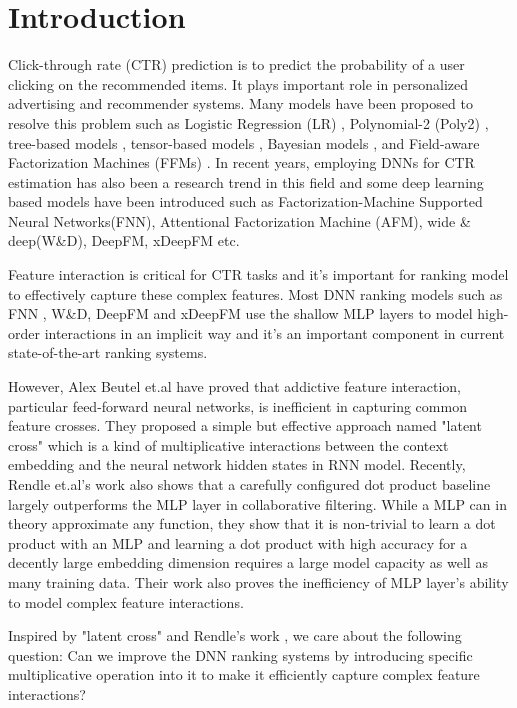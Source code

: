 \documentclass[sigconf]{acmart}
\begin{document}
\section{Introduction}
Click-through rate (CTR) prediction is to predict the probability of a user clicking on the recommended items. It plays important role in personalized advertising and recommender systems. Many models have been proposed to resolve this problem such as Logistic Regression (LR) \cite{10.1145/2487575.2488200}, Polynomial-2 (Poly2) \cite{rendle2010factorization}, tree-based models \cite{he2014practical}, tensor-based models \cite{koren2009matrix}, Bayesian models \cite{graepel2010web}, and Field-aware Factorization Machines (FFMs) \cite{juan2016field}. In recent years, employing DNNs for CTR estimation has also been a research trend in this field and some deep learning based models have been introduced such as Factorization-Machine Supported Neural Networks(FNN)\cite{zhang2016deep}, Attentional  Factorization Machine (AFM)\cite{cheng2016wide}, wide \& deep(W\&D)\cite{xiao2017attentional}, DeepFM\cite{guo2017deepfm}, xDeepFM\cite{lian2018xdeepfm} etc.


Feature interaction is critical for CTR tasks and it's important for ranking model to effectively capture these complex features. Most DNN ranking models such as FNN , W\&D, DeepFM and xDeepFM use the shallow MLP layers to model high-order interactions in an implicit way and it's an important component in current state-of-the-art ranking systems.


However, Alex Beutel et.al \cite{beutel2018latent} have proved that addictive feature interaction, particular feed-forward neural networks, is inefficient in capturing common feature crosses. They proposed a simple but effective approach named "latent cross" which is a kind of multiplicative interactions between the context embedding and the neural network hidden states in RNN model. Recently, Rendle et.al's work \cite{rendle2020neural} also shows that a carefully configured dot product baseline largely outperforms the MLP layer in collaborative filtering. While a MLP can in theory approximate any function, they show that it is non-trivial to learn a dot product with an MLP and  learning a dot product with high accuracy for a decently large embedding dimension requires a large model capacity as well as many training data. Their work also proves the inefficiency of MLP layer's ability to model complex feature interactions.



Inspired by "latent cross"\cite{beutel2018latent} and Rendle's work \cite{rendle2020neural},  we care about the following question: Can we improve the DNN ranking systems by introducing specific multiplicative operation into it to make it efficiently capture complex feature interactions?
\end{document}
